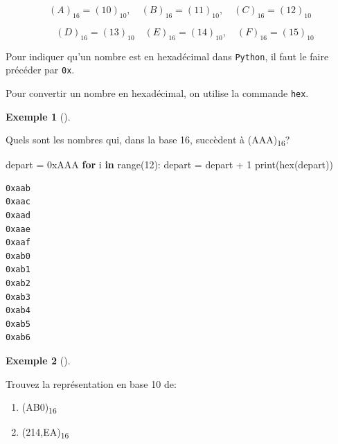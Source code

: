 \documentclass[
  letterpaper,
]{scrbook}
\newenvironment{Shaded}{\begin{snugshade}}{\end{snugshade}}
\newcommand{\BaseNTok}[1]{\textcolor[rgb]{0.25,0.63,0.44}{#1}}
\newcommand{\BuiltInTok}[1]{\textcolor[rgb]{0.00,0.50,0.00}{#1}}
\newcommand{\ControlFlowTok}[1]{\textcolor[rgb]{0.00,0.44,0.13}{\textbf{#1}}}
\newcommand{\DecValTok}[1]{\textcolor[rgb]{0.25,0.63,0.44}{#1}}
\newcommand{\KeywordTok}[1]{\textcolor[rgb]{0.00,0.44,0.13}{\textbf{#1}}}
\newcommand{\NormalTok}[1]{\textcolor[rgb]{0.00,0.44,0.13}{#1}}
\newcommand{\OperatorTok}[1]{\textcolor[rgb]{0.40,0.40,0.40}{#1}}
\providecommand{\tightlist}{%
  \setlength{\itemsep}{0pt}\setlength{\parskip}{0pt}}\usepackage{longtable,booktabs,array}
\theoremstyle{plain}
\theoremstyle{definition}
\theoremstyle{definition}
\newtheorem{example}{Exemple}[chapter]
\theoremstyle{remark}
\begin{document}
\[
(A)_{16}=(10)_{10}, \quad (B)_{16}=(11)_{10}, \quad (C)_{16}=(12)_{10}
\]

\[
\quad (D)_{16}=(13)_{10} \quad (E)_{16}=(14)_{10}, \quad (F)_{16}=(15)_{10}
\]

\begin{tcolorbox}[enhanced jigsaw, colbacktitle=quarto-callout-tip-color!10!white, toptitle=1mm, left=2mm, toprule=.15mm, opacityback=0, bottomrule=.15mm, breakable, coltitle=black, title=\textcolor{quarto-callout-tip-color}{\faLightbulb}\hspace{0.5em}{Nombres hexadécimaux en \texttt{Python}}, colframe=quarto-callout-tip-color-frame, arc=.35mm, titlerule=0mm, rightrule=.15mm, opacitybacktitle=0.6, leftrule=.75mm, bottomtitle=1mm, colback=white]

Pour indiquer qu'un nombre est en hexadécimal dans \texttt{Python}, il
faut le faire précéder par \texttt{0x}.

Pour convertir un nombre en hexadécimal, on utilise la commande
\texttt{hex}.

\end{tcolorbox}

\begin{example}[]\protect\hypertarget{exm-nombres-succedent-hexa}{}\label{exm-nombres-succedent-hexa}

Quels sont les nombres qui, dans la base 16, succèdent à
(AAA)\textsubscript{16}?

\begin{Shaded}
\begin{Highlighting}[]
\NormalTok{depart }\OperatorTok{=} \BaseNTok{0xAAA}
\ControlFlowTok{for}\NormalTok{ i }\KeywordTok{in} \BuiltInTok{range}\NormalTok{(}\DecValTok{12}\NormalTok{):}
\NormalTok{    depart }\OperatorTok{=}\NormalTok{ depart }\OperatorTok{+} \DecValTok{1}
    \BuiltInTok{print}\NormalTok{(}\BuiltInTok{hex}\NormalTok{(depart))}
\end{Highlighting}
\end{Shaded}

\begin{verbatim}
0xaab
0xaac
0xaad
0xaae
0xaaf
0xab0
0xab1
0xab2
0xab3
0xab4
0xab5
0xab6
\end{verbatim}

\end{example}

\begin{example}[]\protect\hypertarget{exm-conversion-hexa-decimal}{}\label{exm-conversion-hexa-decimal}

Trouvez la représentation en base 10 de:

\begin{enumerate}
\def\labelenumi{\alph{enumi})}
\tightlist
\item
  (AB0)\textsubscript{16}
\item
  (214,EA)\textsubscript{16}
\end{enumerate}

\end{example}
\end{document}
